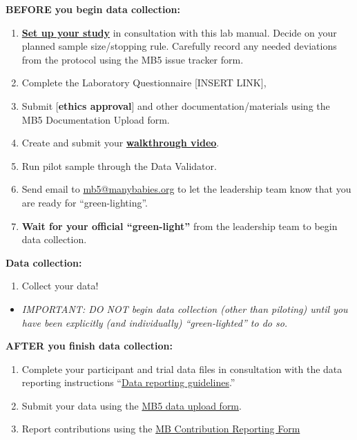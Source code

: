 \documentclass[
]{book}
\providecommand{\tightlist}{%
  \setlength{\itemsep}{0pt}\setlength{\parskip}{0pt}}
\begin{document}
\textbf{BEFORE you begin data collection:}

\begin{enumerate}
\def\labelenumi{\arabic{enumi}.}
\setcounter{enumi}{3}
\tightlist
\item
  \hyperref[setting-up-the-experiment]{\textbf{Set up your study}} in consultation with this lab manual. Decide on your planned sample size/stopping rule. Carefully record any needed deviations from the protocol using the MB5 issue tracker form.
\item
  Complete the Laboratory Questionnaire {[}INSERT LINK{]},
\item
  Submit {[}\textbf{ethics approval}{]} and other documentation/materials using the MB5 Documentation Upload form.
\item
  Create and submit your \hyperref[walkthrough-video]{\textbf{walkthrough video}}.
\item
  Run pilot sample through the Data Validator.
\item
  Send email to \url{mb5@manybabies.org} to let the leadership team know that you are ready for ``green-lighting''.
\item
  \textbf{Wait for your official ``green-light''} from the leadership team to begin data collection.
\end{enumerate}

\textbf{Data collection:}

\begin{enumerate}
\def\labelenumi{\arabic{enumi}.}
\setcounter{enumi}{10}
\tightlist
\item
  Collect your data!
\end{enumerate}

\begin{itemize}
\tightlist
\item
  \emph{IMPORTANT: DO NOT begin data collection (other than piloting) until you have been explicitly (and individually) ``green-lighted'' to do so.}
\end{itemize}

\textbf{AFTER you finish data collection:}

\begin{enumerate}
\def\labelenumi{\arabic{enumi}.}
\setcounter{enumi}{11}
\tightlist
\item
  Complete your participant and trial data files in consultation with the data reporting instructions ``\hyperref[data-reporting-guidelines]{Data reporting guidelines}.''
\item
  Submit your data using the \href{https://docs.google.com/forms/d/e/1FAIpQLSeydFOC2LviKVBhHEpExH5SEJsqH0705pxH8gwHsPDN13Qk6Q/viewform?usp=sf_link}{MB5 data upload form}.
\item
  Report contributions using the \href{https://manybabies.org/credit/}{MB Contribution Reporting Form}
\end{enumerate}
\end{document}

